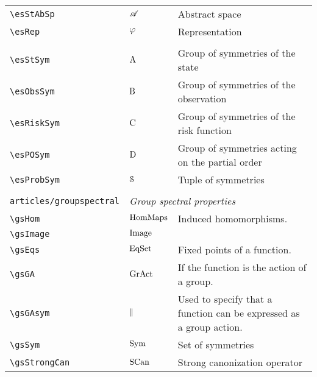 \begin{longtable}{lll}
 {\color[rgb]{0.5,0.5,0.5}\texttt{\textbackslash esStAbSp}} & $\mathscr{A}$ &  Abstract space\\ 
 {\color[rgb]{0.5,0.5,0.5}\texttt{\textbackslash esRep}} & $\varphi$ &  Representation\\ 
  &  & {\setlength\fboxsep{1pt}%
\fbox{%
\color[rgb]{0.5,0.5,0.5}\begin{minipage}[]{8cm}%
$\esRep: \esSt \mapsto \esStAb$.\par%
{\small{\texttt{\$\textbackslash esRep: \textbackslash esSt \textbackslash mapsto \textbackslash esStAb\$.}}}\end{minipage}%
}%
}%
\\ 
 {\color[rgb]{0.5,0.5,0.5}\texttt{\textbackslash esStSym}} & $\mathrm{A}$ &  Group of symmetries of the state\\ 
 {\color[rgb]{0.5,0.5,0.5}\texttt{\textbackslash esObsSym}} & $\mathrm{B}$ &  Group of symmetries of the observation\\ 
 {\color[rgb]{0.5,0.5,0.5}\texttt{\textbackslash esRiskSym}} & $\mathrm{C}$ &  Group of symmetries of the risk function\\ 
 {\color[rgb]{0.5,0.5,0.5}\texttt{\textbackslash esPOSym}} & $\mathrm{D}$ &  Group of symmetries acting on the partial order\\ 
 {\color[rgb]{0.5,0.5,0.5}\texttt{\textbackslash esProbSym}} & $\mathcal{S}$ &  Tuple of symmetries\\ 
  &  & \\ 
 {\color[rgb]{0.5,0.5,0.5}\texttt{articles/groupspectral}} & \multicolumn{2}{l}{\emph{Group spectral properties}}\\ 
 \hline
{\color[rgb]{0.5,0.5,0.5}\texttt{\textbackslash gsHom}} & $\text{HomMaps}$ &  Induced homomorphisms.\\ 
 {\color[rgb]{0.5,0.5,0.5}\texttt{\textbackslash gsImage}} & $\text{Image}$ &  \\ 
 {\color[rgb]{0.5,0.5,0.5}\texttt{\textbackslash gsEqs}} & $\text{EqSet}$ &  Fixed points of a function.\\ 
 {\color[rgb]{0.5,0.5,0.5}\texttt{\textbackslash gsGA}} & $\text{GrAct}$ &  If the function is the action of a group.\\ 
 {\color[rgb]{0.5,0.5,0.5}\texttt{\textbackslash gsGAsym}} & $\parallel$ &  Used to specify that a function can be expressed as a group action.\\ 
 {\color[rgb]{0.5,0.5,0.5}\texttt{\textbackslash gsSym}} & $\text{Sym}$ &  Set of symmetries\\ 
 {\color[rgb]{0.5,0.5,0.5}\texttt{\textbackslash gsStrongCan}} & $\text{SCan}$ &  Strong canonization operator\\ 

\end{longtable}
